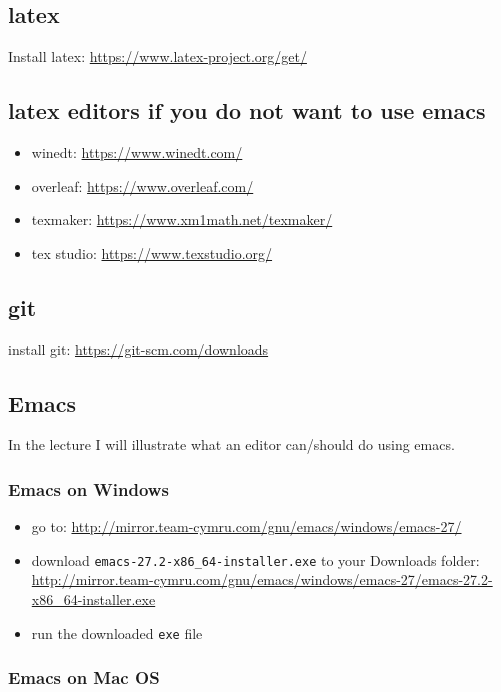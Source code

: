 \documentclass[11pt]{article}
\begin{document}
\subsection{latex}

Install latex: \url{https://www.latex-project.org/get/}



\subsection{latex editors if you do not want to use emacs}

\begin{itemize}
\item winedt: \url{https://www.winedt.com/}
\item overleaf: \url{https://www.overleaf.com/}
\item texmaker: \url{https://www.xm1math.net/texmaker/}
\item tex studio: \url{https://www.texstudio.org/}
\end{itemize}


\subsection{git}

install git: \url{https://git-scm.com/downloads}

\subsection{Emacs}

In the lecture I will illustrate what an editor can/should do using emacs.


\subsubsection{Emacs on Windows}

\begin{itemize}
\item go to: \url{http://mirror.team-cymru.com/gnu/emacs/windows/emacs-27/}
\item download \texttt{emacs-27.2-x86\_64-installer.exe} to your Downloads folder: \url{http://mirror.team-cymru.com/gnu/emacs/windows/emacs-27/emacs-27.2-x86\_64-installer.exe}
\item run the downloaded \texttt{exe} file
\end{itemize}

\subsubsection{Emacs on Mac OS}
\end{document}
